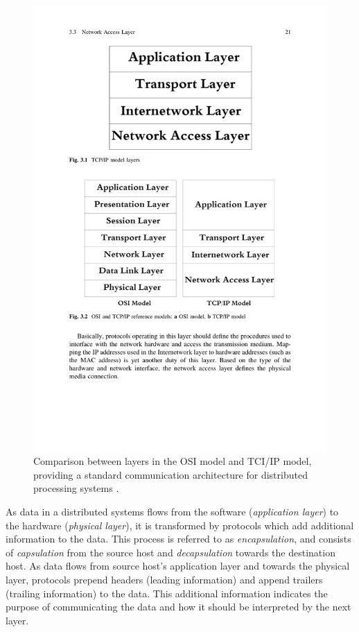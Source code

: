 \documentclass[../report.tex]{subfiles}
\begin{document}
\begin{figure}[H]
\centering
\includegraphics[width=0.8\linewidth]{figures/ositcilayers.pdf}
\caption{Comparison between layers in the OSI model and TCI/IP model, providing a standard communication architecture for distributed processing systems \cite[p. 21]{alani2014guide}.}
\label{fig:ositcilayers}
\end{figure}

As data in a distributed systems flows from the software (\textit{application layer}) to the hardware (\textit{physical layer}), it is transformed by protocols which add additional information to the data. This process is referred to as \textit{encapsulation}, and consists of \textit{capsulation} from the source host and \textit{decapsulation} towards the destination host. As data flows from source host's application layer and towards the physical layer, protocols prepend headers (leading information) and append trailers (trailing information) to the data. This additional information indicates the purpose of communicating the data and how it should be interpreted by the next layer. \\
\end{document}
